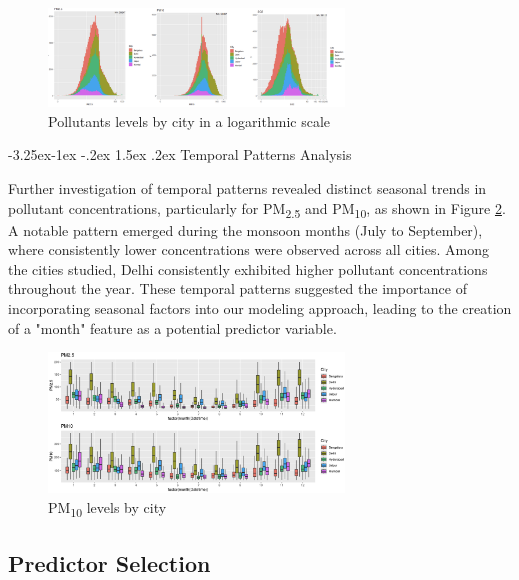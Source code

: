 \documentclass[twoside,11pt]{article}
\makeatletter
\renewcommand\subsubsection{\@startsection{subsubsection}{3}{\z@}%
  {-3.25ex\@plus -1ex \@minus -.2ex}%
  {1.5ex \@plus .2ex}%
  {\normalfont\bfseries\normalsize}}
\makeatother
\begin{document}
\begin{figure}[H]
  \centering
  \includegraphics[width=0.7\textwidth]{log-scaled-pollutants.png}
  \caption{Pollutants levels by city in a logarithmic scale}
  \label{fig:log_scaled_pollutants}
\end{figure}

\subsubsection{Temporal Patterns Analysis}

Further investigation of temporal patterns revealed distinct seasonal trends in pollutant concentrations, particularly for PM\textsubscript{2.5} and PM\textsubscript{10}, as shown in Figure \ref{fig:seasonal_trends}. A notable pattern emerged during the monsoon months (July to September), where consistently lower concentrations were observed across all cities. Among the cities studied, Delhi consistently exhibited higher pollutant concentrations throughout the year. These temporal patterns suggested the importance of incorporating seasonal factors into our modeling approach, leading to the creation of a "month" feature as a potential predictor variable.

\begin{figure}[H]
  \centering
  \includegraphics[width=0.7\textwidth]{seasonal-trends.png}
  \caption{PM\textsubscript{10} levels by city}
  \label{fig:seasonal_trends}
\end{figure}

\subsection{Predictor Selection}
\end{document}
